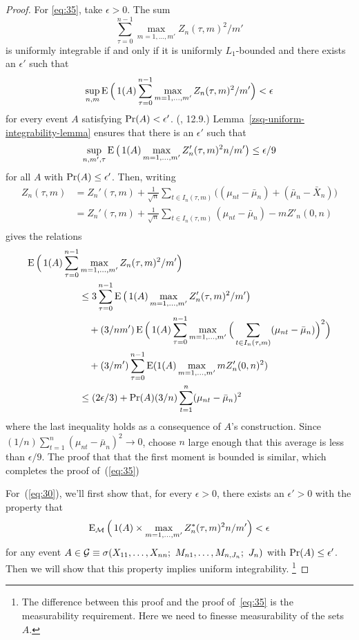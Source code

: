 \documentclass[11pt]{article}
\begin{document}
\begin{proof}
  For \eqref{eq:35}, take $\epsilon > 0$. The sum
  \[
  \sum_{\tau=0}^{n-1} \max_{m=1,\dots,m'} Z_n(\tau, m)^2 / m'
  \]
  is uniformly integrable if and only if it is uniformly $L_1$-bounded
  and there exists an $\epsilon'$ such that
  \[
  \sup_{n, m} \operatorname{E}\Big( \operatorname{1}(A) \sum_{\tau=0}^{n-1} \max_{m=1,\dots,m'} Z_n(\tau, m)^2 / m' \Big)
  < \epsilon
  \]
  for every event $A$ satisfying $\operatorname{Pr}(A) < \epsilon'$.
  (\citealp{Dav:94}, 12.9.)
  Lemma~\ref{zsq-uniform-integrability-lemma} ensures that there is an
  $\epsilon'$ such that
  \begin{equation*}
    \sup_{n, m', \tau} \operatorname{E}\big( \operatorname{1}(A) \max_{m=1,\dots,m'} Z_n'(\tau, m)^2 n / m' \big) \leq \epsilon / 9
  \end{equation*}
  for all $A$ with $\operatorname{Pr}(A) \leq \epsilon'$. Then, writing
  \begin{align*}
    Z_n(\tau, m) &= Z_n'(\tau, m)
    + \tfrac{1}{\sqrt{n}} \sum_{t \in I_n(\tau, m)}
    \big((\mu_{nt} - \bar \mu_n) + (\bar \mu_n - \bar X_n)\big) \\
    &= Z_n'(\tau, m)
    + \tfrac{1}{\sqrt{n}} \sum_{t \in I_n(\tau, m)} (\mu_{nt} - \bar \mu_n)
    - m Z'_n(0, n) \\
  \end{align*}
  gives the relations
  \begin{align*}
    \operatorname{E}\Big(\operatorname{1}(A) \sum_{\tau=0}^{n-1} & \max_{m=1,\dots,m'} Z_n(\tau, m)^2/m'\Big) \\
    &\leq 3 \sum_{\tau=0}^{n-1} \operatorname{E}\big( \operatorname{1}(A)  \max_{m=1,\dots,m'} Z'_n(\tau, m)^2/m'\big) \\
    &\quad+(3/n m') \operatorname{E}\Big(\operatorname{1}(A) \sum_{\tau=0}^{n-1} \max_{m=1,\dots,m'}
    \Big(\sum_{t \in I_n(\tau, m)} (\mu_{nt} - \bar \mu_n) \Big)^2\Big) \\
    &\quad+ (3/m') \sum_{\tau=0}^{n-1}
    \operatorname{E} (\operatorname{1}(A) \max_{m=1,\dots,m'} m Z'_n(0, n)^2) \\
    &\leq (2 \epsilon/3) + \operatorname{Pr}(A) (3/n)\sum_{t=1}^n (\mu_{nt} - \bar \mu_n)^2
  \end{align*}
  where the last inequality holds as a consequence of $A$'s
  construction. Since $(1/n)\sum_{t=1}^n (\mu_{nt} - \bar \mu_n)^2 \to
  0$, choose $n$ large enough that this average is less than
  $\epsilon/9$. The proof that that the first moment is bounded is
  similar, which completes the proof of~(\ref{eq:35})

  For~(\ref{eq:30}), we'll first show that, for every $\epsilon > 0$,
  there exists an $\epsilon' > 0$ with the property that
  \begin{equation}\label{eq:31}
    \operatorname{E}_{\mathcal{M}} \Big(\operatorname{1}(A) \times \max_{m = 1,\dots,m'} Z^*_n(\tau, m)^2 n / m'\Big) < \epsilon
  \end{equation}
  for any event $A \in \mathcal{G} \equiv \sigma(X_{11},\dots,X_{nn};\
  M_{n1},\dots,M_{n,J_n};\ J_n)$ with $\operatorname{Pr}(A) \leq \epsilon'$. Then we
  will show that this property implies uniform integrability.%
\footnote{The difference between this proof and the proof
  of~\eqref{eq:35} is the measurability requirement. Here we need to
  finesse measurability of the sets $A$.} %


\end{proof}
\end{document}
